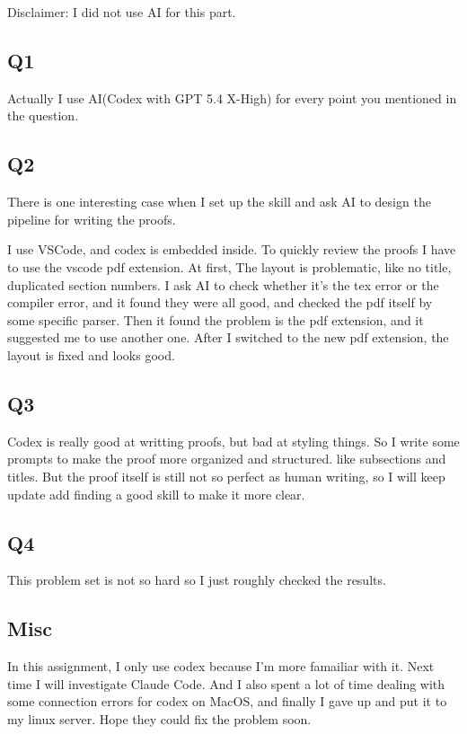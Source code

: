 \documentclass{article}
\begin{document}
Disclaimer: I did not use AI for this part.

\subsection{Q1}

Actually I use AI(Codex with GPT 5.4 X-High) for every point you mentioned in the question.

\subsection{Q2}

There is one interesting case when I set up the skill and ask AI to design the pipeline for writing the proofs.

I use VSCode, and codex is embedded inside. To quickly review the proofs I have to use the vscode pdf extension. At first, The layout is problematic,
like no title, duplicated section numbers. I ask AI to check whether it's the tex error or the compiler error, and it found they were all good, and checked the pdf
itself by some specific parser. Then it found the problem is the pdf extension, and it suggested me to use another one. After I switched to the new pdf extension, the layout is fixed and looks good.

\subsection{Q3}

Codex is really good at writting proofs, but bad at styling things. So I write some prompts to make the proof more organized and structured. like subsections and titles.
But the proof itself is still not so perfect as human writing, so I will keep update add finding a good skill to make it more clear.

\subsection{Q4}

This problem set is not so hard so I just roughly checked the results.

\subsection{Misc}

In this assignment, I only use codex because I'm more famailiar with it. Next time I will investigate Claude Code. And I also spent a lot of time dealing with some
connection errors for codex on MacOS, and finally I gave up and put it to my linux server. Hope they could fix the problem soon.
\end{document}
